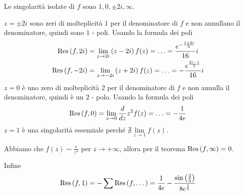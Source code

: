 \Soluzione

Le singolarità isolate di $f$ sono $1, 0, \pm 2i, \infty $.

$z = \pm 2i$ sono zeri di molteplicità $1$ per il denominatore di $f$ e non annullano il denominatore, quindi sono $1$ - poli. Usando la formula dei poli
\begin{gather*}
\operatorname{Res} \left(f, 2i\right) = \lim\limits_{z\rightarrow 2i}\left(z - 2i\right) f(z) = \dotsc = \frac{e^{- \frac{1 + 2i}{5}}}{16} i\\
\operatorname{Res} \left(f, - 2i\right) = \lim\limits_{z\rightarrow - 2i}\left(z + 2i\right) f(z) = \dotsc = - \frac{e^{\frac{2i - 1}{5}}}{16} i
\end{gather*}
$z = 0$ è uno zero di molteplicità $2$ per il denominatore di $f$ e non annulla il denominatore, quindi è un $2$ - polo. Usando la formula dei poli
\begin{equation*}
\operatorname{Res} \left(f, 0\right) = \lim\limits_{z\rightarrow 0}\frac{d}{dz} z^{2} f(z) = \dotsc = - \frac{1}{4e}
\end{equation*}
$z = 1$ è una singolarità essenziale perché $\nexists \lim\limits_{z\rightarrow 1} f(z)$.

Abbiamo che $f(z) \sim \frac{e}{z^{4}}$ per $z\rightarrow + \infty $, allora per il teorema $\operatorname{Res} \left(f, \infty \right) = 0$.

Infine
\begin{equation*}
\operatorname{Res} \left(f, 1\right) = - \sum \operatorname{Res} \left(f, \dotsc \right) = \frac{1}{4e} - \frac{\sin\left(\frac{2}{5}\right)}{8e^{\frac{1}{5}}}
\end{equation*}

\Soluzione

